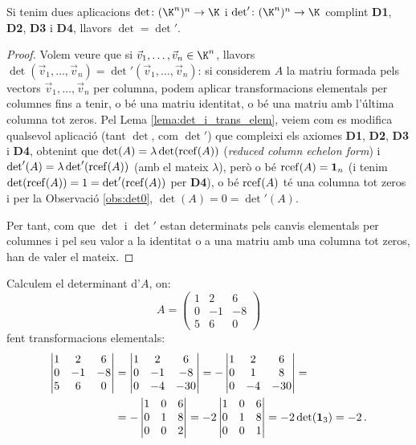 \begin{teorema}
 Si tenim dues aplicacions $\det\colon (\K^n)^n \to \K$ i $\det'\colon (\K^n)^n \to \K$ complint \textbf{D1}, \textbf{D2}, \textbf{D3} i \textbf{D4}, llavors $\det=\det'$.
\end{teorema}
\begin{proof}
    Volem veure que si $\vec v_1, \dots , \vec v_n \in \K^n$, llavors $\det(\vec v_1, \dots , \vec v_n)=\det'(\vec v_1, \dots , \vec v_n)$: si considerem $A$ la matriu formada pels vectors $\vec v_1, \dots, \vec v_n$ per columna, podem aplicar transformacions elementals per columnes fins a tenir, o bé una matriu identitat, o bé una matriu amb l'última columna tot zeros. Pel Lema \ref{lema:det_i_trans_elem}, veiem com es modifica qualsevol aplicació (tant $\det$, com $\det'$) que compleixi els axiomes \textbf{D1}, \textbf{D2}, \textbf{D3} i \textbf{D4}, obtenint que $\det(A)=\lambda\det(\operatorname{rcef}(A))$ (\emph{reduced column echelon form}) i $\det'(A)=\lambda\det'(\operatorname{rcef}(A))$ (amb el mateix $\lambda$), però o bé $\operatorname{rcef}(A)=\mathbf{1}_n$ (i tenim $\det(\operatorname{rcef}(A))=1=\det'(\operatorname{rcef}(A))$ per \textbf{D4}), o bé $\operatorname{rcef}(A)$ té una columna tot zeros i per la Observació \ref{obs:det0}, $\det(A)=0=\det'(A)$.

    Per tant, com que $\det$ i $\det'$ estan determinats pels canvis elementals per columnes i pel seu valor a la identitat o a una matriu amb una columna tot zeros, han de valer el mateix.
\end{proof}

\begin{exemple}
	Calculem el determinant d'$A$, on:$$
	A=\begin{pmatrix}
	1 & 2 & 6 \\ 0 & -1 & -8 \\ 5 & 6 & 0
	\end{pmatrix}
	$$
	fent transformacions elementals:
	\begin{align*}
	\begin{vmatrix}
	1 & 2 & 6 \\ 0 & -1 & -8 \\ 5 & 6 & 0
	\end{vmatrix} & =
	\begin{vmatrix}
	1 & 2 & 6 \\ 0 & -1 & -8 \\ 0 & -4 & -30
	\end{vmatrix}= 
	-\begin{vmatrix}
	1 & 2 & 6 \\ 0 & 1 & 8 \\ 0 & -4 & -30
	\end{vmatrix}= \\ &
	= -\begin{vmatrix}
	1 & 0 & 6 \\ 0 & 1 & 8 \\ 0 & 0 & 2
	\end{vmatrix}=
	-2\begin{vmatrix}
	1 & 0 & 6 \\ 0 & 1 & 8 \\ 0 & 0 & 1
	\end{vmatrix}= -2 \det(\mathbf{1}_3)=-2\,.
	\end{align*}
\end{exemple}

